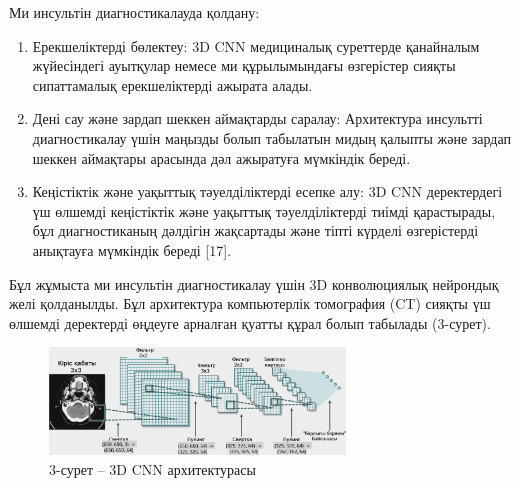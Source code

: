 \begin{multicols}{2}
Ми инсультін диагностикалауда қолдану:

\begin{enumerate}
\def\labelenumi{\arabic{enumi}.}
\item
  Ерекшеліктерді бөлектеу: 3D CNN медициналық суреттерде қанайналым
  жүйесіндегі ауытқулар немесе ми құрылымындағы өзгерістер сияқты
  сипаттамалық ерекшеліктерді ажырата алады.
\item
  Дені сау және зардап шеккен аймақтарды саралау: Архитектура инсультті
  диагностикалау үшін маңызды болып табылатын мидың қалыпты және зардап
  шеккен аймақтары арасында дәл ажыратуға мүмкіндік береді.
\item
  Кеңістіктік және уақыттық тәуелділіктерді есепке алу: 3D CNN
  деректердегі үш өлшемді кеңістіктік және уақыттық тәуелділіктерді
  тиімді қарастырады, бұл диагностиканың дәлдігін жақсартады және тіпті
  күрделі өзгерістерді анықтауға мүмкіндік береді {[}17{]}.
\end{enumerate}

Бұл жұмыста ми инсультін диагностикалау үшін 3D конволюциялық нейрондық
желі қолданылды. Бұл архитектура компьютерлік томография (CT) сияқты үш
өлшемді деректерді өңдеуге арналған қуатты құрал болып табылады
(3-сурет).
\end{multicols}

\begin{figure}[H]
	\centering
	\includegraphics[width=0.7\textwidth]{assets/3}
	\caption*{3-сурет -- 3D CNN архитектурасы}
\end{figure}

